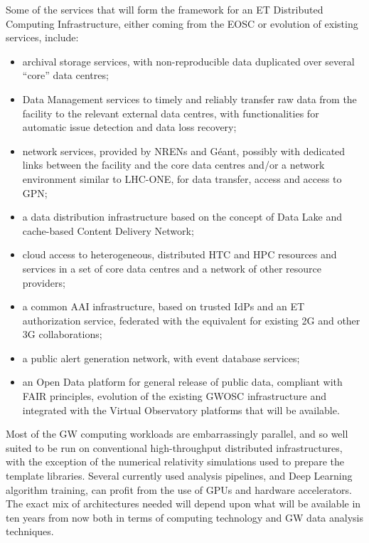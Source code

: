Some of the services that will form the framework for an ET Distributed
Computing Infrastructure, either coming from the EOSC or evolution of existing
services, include:
\begin{itemize}
\item archival storage services, with non-reproducible data duplicated over
several ``core'' data centres;
\item Data Management services to timely and reliably transfer raw data from the facility to the relevant external data centres, with functionalities for automatic issue detection and data loss recovery;
\item network services, provided by NRENs and G\'{e}ant, possibly with dedicated links between the facility and the core data centres and/or a network environment similar to LHC-ONE, for data transfer, access and access to GPN;
\item a data distribution infrastructure based on the concept of Data Lake and cache-based Content Delivery Network;
\item cloud access to heterogeneous, distributed HTC and HPC resources and services in a set of core data centres and a network of other resource providers;
\item a common AAI infrastructure, based on trusted IdPs and an ET authorization service, federated with the equivalent for existing 2G and other 3G collaborations;
\item a public alert generation network, with event database services;
\item an Open Data platform for general release of public data, compliant with FAIR principles, evolution of the existing GWOSC infrastructure and integrated with the Virtual Observatory platforms that will be available.
\end{itemize}

Most of the GW computing workloads are embarrassingly parallel, and so well suited to be run on conventional high-throughput distributed infrastructures, with the exception of the numerical relativity simulations used to prepare the template libraries. Several currently used analysis pipelines, and Deep Learning algorithm training, can profit from the use of GPUs and hardware accelerators.  The exact mix of  architectures needed will depend upon what will be available in ten years from now both in terms of computing technology and GW data analysis techniques.
